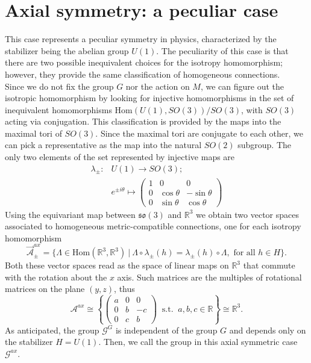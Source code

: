 \documentclass{article}
\numberwithin{equation}{section}
\theoremstyle{definition}
\newcommand{\R}{\mathbb{R}}
\newcommand{\A}{\mathcal{A}}
\newcommand{\so}[1]{\mathfrak{so}(#1)}
\begin{document}
\section{Axial symmetry: a peculiar case}
This case represents a peculiar symmetry in physics, characterized by the stabilizer being the abelian group \( U(1) \). The peculiarity of this case is that there are two possible inequivalent choices for the isotropy homomorphism; however, they provide the same classification of homogeneous connections.\\
Since we do not fix the group $G$ nor the action on $M$, we can figure out the isotropic homomorphism by looking for injective homomorphisms in the set of inequivalent homomorphisms $\mathrm{Hom}(U(1), SO(3))/SO(3)$, with $SO(3)$ acting via conjugation. This classification is provided by the maps into the maximal tori of $SO(3)$. Since the maximal tori are conjugate to each other, we can pick a representative as the map into the natural $SO(2)$ subgroup. The only two elements of the set represented by injective maps are 
\begin{align}
\nonumber
     \lambda_{\pm}:&U(1)\to SO(3);\\
    &e^{\pm i\theta}\mapsto \begin{pmatrix}
        1 & 0 & 0\\
        0 & \cos{\theta} & -\sin{ \theta}\\
        0 & \sin{ \theta} & \cos{\theta}
    \end{pmatrix}
\end{align}
Using the equivariant map between $\so{3}$ and $\R^3$ we obtain two vector spaces associated to homogeneous metric-compatible connections, one for each isotropy homomorphism 
\[\vec{\A}_{\pm}^{ax}=\{\Lambda\in \mathrm{Hom}(\R^3,\R^3)\ |\ \Lambda\circ \lambda_{\pm}(h)=\lambda_{\pm}(h)\circ\Lambda,\text{ for all }  h\in H\}.\]
Both these vector spaces read as the space of linear maps on $\R^3$ that commute with the rotation about the $x$ axis. Such matrices are the multiples of rotational matrices on the plane $(y,z)$, thus
\begin{equation}
\label{connAx}
    \A^{ax}\cong \left\{\begin{pmatrix}
        a & 0 & 0\\
        0 & b & -c\\
        0 & c & b
    \end{pmatrix}\ \text{ s.t. }\ a,b,c\in\R \right\}\cong \R^3.
\end{equation}
As anticipated, the group $\mathcal{G}^G$ is independent of the group $G$ and depends only on the stabilizer $H=U(1)$. Then, we call the group in this axial symmetric case $\mathcal{G}^{ax}$.
\end{document}
